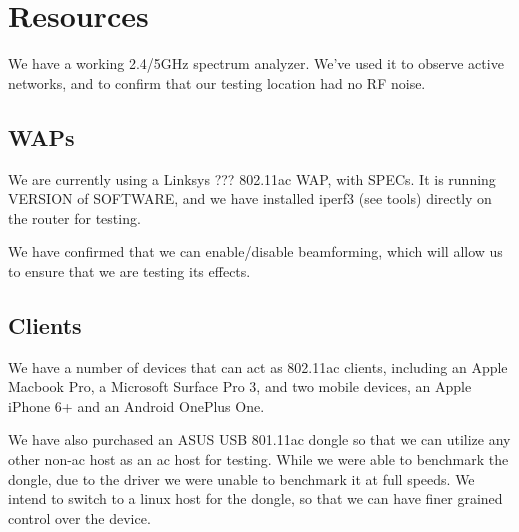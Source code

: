 \section{Resources}

We have a working 2.4/5GHz spectrum analyzer. We've used it to observe
active networks, and to confirm that our testing location had no RF
noise.

\subsection{WAPs}


We are currently using a Linksys ??? 802.11ac WAP, with SPECs. It is running
VERSION of SOFTWARE, and we have installed iperf3 (see tools) directly on the
router for testing.

We have confirmed that we can enable/disable beamforming, which will
allow us to ensure that we are testing its effects.

\subsection{Clients}

We have a number of devices that can act as
802.11ac clients, including an Apple Macbook Pro, a Microsoft Surface Pro 3,
and two mobile devices, an Apple iPhone 6+ and an Android OnePlus
One.

We have also purchased an ASUS USB 801.11ac dongle so that we can
utilize any other non-ac host as an ac host for testing. While we were
able to benchmark the dongle, due to the driver we were unable to
benchmark it at full speeds. We intend to switch to a linux host for
the dongle, so that we can have finer grained control over the device.
